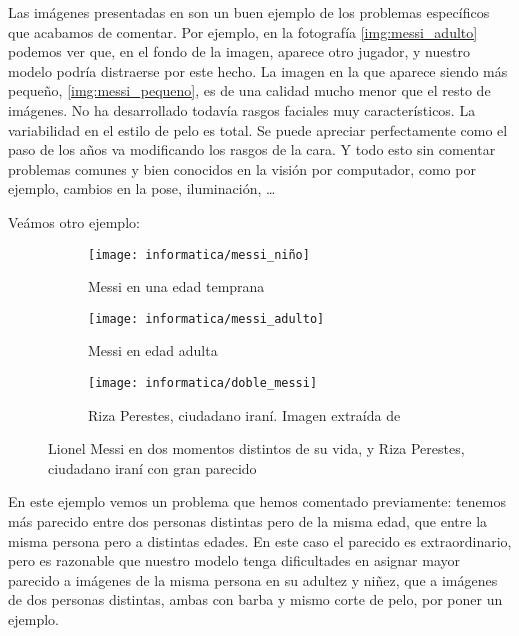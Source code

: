 Las imágenes presentadas en  son un buen ejemplo de los problemas específicos que acabamos de comentar. Por ejemplo, en la fotografía \ref{img:messi_adulto} podemos ver que, en el fondo de la imagen, aparece otro jugador, y nuestro modelo podría distraerse por este hecho. La imagen en la que aparece siendo más pequeño, \ref{img:messi_pequeno}, es de una calidad mucho menor que el resto de imágenes. No ha desarrollado todavía rasgos faciales muy característicos. La variabilidad en el estilo de pelo es total. Se puede apreciar perfectamente como el paso de los años va modificando los rasgos de la cara. Y todo esto sin comentar problemas comunes y bien conocidos en la visión por computador, como por ejemplo, cambios en la pose, iluminación, \ldots

Veámos otro ejemplo:

\begin{figure}[H]
\centering
    \begin{subfigure}{0.5\textwidth}
        \centering
        \texttt{[image: informatica/messi\_niño]}
        \caption{Messi en una edad temprana}
    \end{subfigure}%
    \begin{subfigure}{.5\textwidth}
        \centering
        \texttt{[image: informatica/messi\_adulto]}
        \caption{Messi en edad adulta}
    \end{subfigure}

    \begin{subfigure}{.8\textwidth}
        \centering
        \texttt{[image: informatica/doble\_messi]}
        \caption{Riza Perestes, ciudadano iraní. Imagen extraída de \cite{informatica:imitador_messi}}
    \end{subfigure}

\caption{Lionel Messi en dos momentos distintos de su vida, y Riza Perestes, ciudadano iraní con gran parecido}
\label{img:messi_distintos_otro_adulto}
\end{figure}

En este ejemplo vemos un problema que hemos comentado previamente: tenemos más parecido entre dos personas distintas pero de la misma edad, que entre la misma persona pero a distintas edades. En este caso el parecido es extraordinario, pero es razonable que nuestro modelo tenga dificultades en asignar mayor parecido a imágenes de la misma persona en su adultez y niñez, que a imágenes de dos personas distintas, ambas con barba y mismo corte de pelo, por poner un ejemplo.

